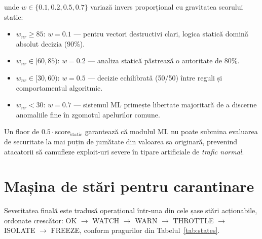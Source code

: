 \noindent unde $w \in \{0.1, 0.2, 0.5, 0.7\}$ variază invers proporțional cu gravitatea scorului static:

\begin{itemize}
    \item $w_{nr} \geq 85$: $w = 0.1$ --- pentru vectori destructivi clari, logica statică domină absolut decizia (90\%).
    \item $w_{nr} \in [60, 85)$: $w = 0.2$ --- analiza statică păstrează o autoritate de 80\%.
    \item $w_{nr} \in [30, 60)$: $w = 0.5$ --- decizie echilibrată (50/50) între reguli și comportamentul algoritmic.
    \item $w_{nr} < 30$: $w = 0.7$ --- sistemul ML primește libertate majoritară de a discerne anomaliile fine în zgomotul apelurilor comune.
\end{itemize}

\par Un floor de $0.5 \cdot \text{score}_{\text{static}}$ garantează că modulul ML nu poate submina evaluarea de securitate la mai puțin de jumătate din valoarea sa originară, prevenind atacatorii să camufleze exploit-uri severe în tipare artificiale de \textit{trafic normal}.


\section{Mașina de stări pentru carantinare}
\label{sec:state_machine}

\par Severitatea finală este tradusă operațional într-una din cele șase stări acționabile, ordonate crescător: OK $\rightarrow$ WATCH $\rightarrow$ WARN $\rightarrow$ THROTTLE $\rightarrow$ ISOLATE $\rightarrow$ FREEZE, conform pragurilor din Tabelul~\ref{tab:states}.

